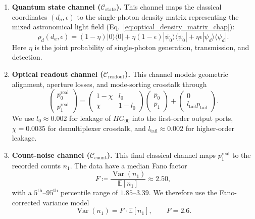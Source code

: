 \begin{enumerate}
    \item \textbf{Quantum state channel ($\mathcal{C}_{\text{state}}$).} This channel maps the classical coordinates $(d_a, \epsilon)$ to the single-photon density matrix representing the mixed astronomical light field (Eq.~\eqref{eq:optical_density_matrix_chap}):
          \begin{equation}
              \rho_d(d_a, \epsilon) = (1 - \eta) |0\rangle\langle 0| + \eta (1 - \epsilon) |\psi_0\rangle\langle\psi_0| + \eta \epsilon |\psi_d\rangle\langle\psi_d|.
          \end{equation}
          Here $\eta$ is the joint probability of single-photon generation, transmission, and detection.

    \item \textbf{Optical readout channel ($\mathcal{C}_{\text{readout}}$).} This channel models geometric alignment, aperture losses, and mode-sorting crosstalk through
          \begin{equation}
              \begin{pmatrix} p_0^{\text{real}} \\ p_1^{\text{real}} \end{pmatrix} =
              \begin{pmatrix} 1 - \chi & l_0 \\ \chi & 1 - l_0 \end{pmatrix}
              \begin{pmatrix} p_0 \\ p_1 \end{pmatrix} +
              \begin{pmatrix} 0 \\ l_{\text{tail}} p_{\text{tail}} \end{pmatrix}.
          \end{equation}
          We use $l_0 \approx 0.002$ for leakage of $HG_{00}$ into the first-order output ports, $\chi = 0.0035$ for demultiplexer crosstalk, and $l_{\text{tail}} \approx 0.002$ for higher-order leakage.

    \item \textbf{Count-noise channel ($\mathcal{C}_{\text{count}}$).} This final classical channel maps $p_1^{\text{real}}$ to the recorded counts $n_1$. The data have a median Fano factor
          \begin{equation}
              F \coloneqq \frac{\operatorname{Var}(n_1)}{\mathbb{E}[n_1]} \approx 2.50,
          \end{equation}
          with a $5^{\text{th}}$--$95^{\text{th}}$ percentile range of $1.85$--$3.39$. We therefore use the Fano-corrected variance model
          \begin{equation}
              \operatorname{Var}(n_1) = F \cdot \mathbb{E}[n_1], \qquad F = 2.6.
              \label{eq:fano_overdispersion}
          \end{equation}
\end{enumerate}

